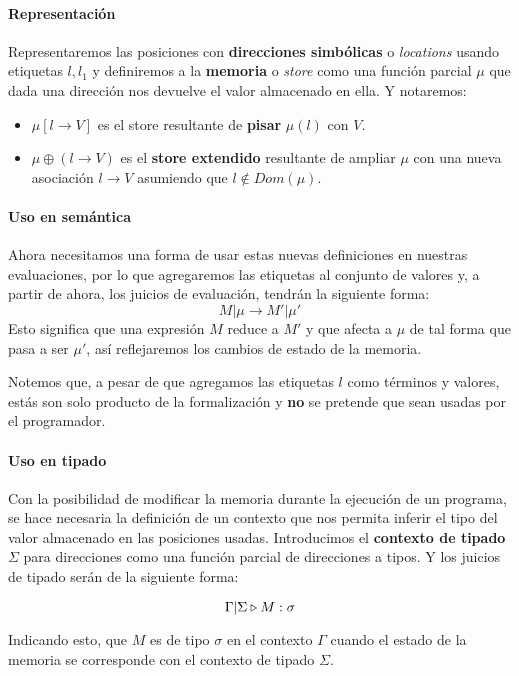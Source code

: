 \paragraph{Representación}
Representaremos las posiciones con \textbf{direcciones simbólicas} o \textit{locations} usando etiquetas $l,l_1$ y definiremos a la \textbf{memoria} o \textit{store} como una función parcial $\mu$ que dada una dirección nos devuelve el valor almacenado en ella. Y notaremos:
\begin{itemize}
    \item $\mu[l\to V]$ es el store resultante de \textbf{pisar} $\mu(l)$ con $V$.
    \item $\mu\oplus(l\to V)$ es el \textbf{store extendido} resultante de ampliar $\mu$ con una nueva asociación $l \to V$ asumiendo que $l \notin Dom(\mu)$.    
\end{itemize}

\paragraph{Uso en semántica} Ahora necesitamos una forma de usar estas nuevas definiciones en nuestras evaluaciones, por lo que agregaremos las etiquetas al conjunto de valores y, a partir de ahora, los juicios de evaluación, tendrán la siguiente forma: 
$$M|\mu \to M'|\mu'$$
Esto significa que una expresión $M$ reduce a $M'$ y que afecta a $\mu$ de tal forma que pasa a ser $\mu'$, así reflejaremos los cambios de estado de la memoria.

Notemos que, a pesar de que agregamos las etiquetas $l$ como términos y valores, estás son solo producto de la formalización y \textbf{no} se pretende que sean usadas por el programador.

\paragraph{Uso en tipado} Con la posibilidad de modificar la memoria durante la ejecución de un programa, se hace necesaria la definición de un contexto que nos permita inferir el tipo del valor almacenado en las posiciones usadas. Introducimos el \textbf{contexto de tipado} $\Sigma$ para direcciones como una función parcial de direcciones a tipos. Y los juicios de tipado serán de la siguiente forma:

$$\Gamma|\Sigma\triangleright M : \sigma$$

Indicando esto, que $M$ es de tipo $\sigma$ en el contexto $\Gamma$ cuando el estado de la memoria se corresponde con el contexto de tipado $\Sigma$.

